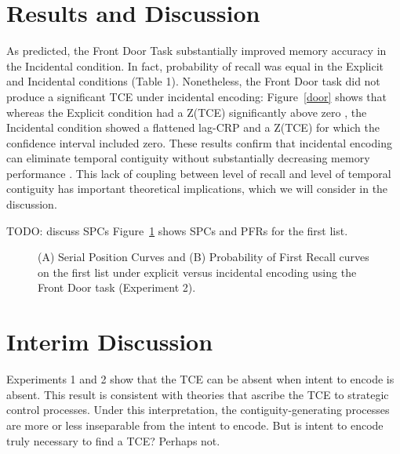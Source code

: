 \documentclass[jou,natbib,floatsintext]{apa6} %
\begin{document}
\section{Results and Discussion}
As predicted, the Front Door Task substantially improved memory accuracy in the Incidental condition. In fact, probability of recall was equal in the Explicit and Incidental conditions (Table 1). Nonetheless, the Front Door task did not produce a significant TCE under incidental encoding: Figure~\ref{door} shows that whereas the Explicit condition \color{red} had a \label{done-11} Z(TCE) significantly above zero \color{black}, the Incidental condition showed a flattened lag-CRP and a Z(TCE) for which the confidence interval included zero. These results confirm that incidental encoding can eliminate temporal contiguity without substantially decreasing memory performance \citep{NairEtal17}. This lack of coupling between level of recall and level of temporal contiguity has important theoretical implications, which we will consider in the discussion.


\begin{figure*}%
\caption{The temporal contiguity effect (TCE) on the first list under explicit versus incidental encoding using the Front Door task (Experiment 2). \paneltext}
\label{door}
\end{figure*}








\color{red}
TODO: discuss SPCs
Figure~\ref{e2_l1_spc} shows SPCs and PFRs for the first list.


\begin{figure}
\caption{(A) Serial Position Curves and (B) Probability of First Recall curves on the first list under explicit versus incidental encoding using the Front Door task (Experiment 2). \spcpaneltext}
\label{e2_l1_spc}
\end{figure}

\color{black}







\section{Interim Discussion}
Experiments 1 and 2 show that the TCE can be absent when intent to encode is absent. This result is consistent with theories that ascribe the TCE to strategic control processes. Under this interpretation, the contiguity-generating processes are more or less inseparable from the intent to encode. But is intent to encode truly necessary to find a TCE? Perhaps not.
\end{document}
